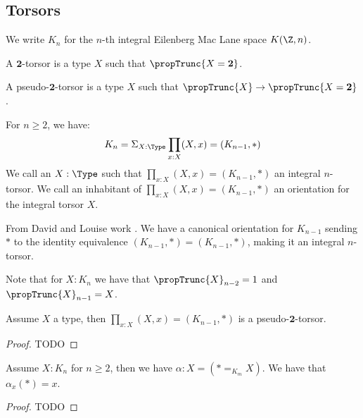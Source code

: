 
\subsection{Torsors}

We write $K_n$ for the $n$-th integral Eilenberg Mac Lane space $K(\Z,n)$.

\begin{definition}
A $\mathbf{2}$-torsor is a type $X$ such that $\propTrunc{X=\mathbf{2}}$.
\end{definition}

\begin{definition}
A pseudo-$\mathbf{2}$-torsor is a type $X$ such that $\propTrunc{X}\to \propTrunc{X=\mathbf{2}}$.
\end{definition}

\begin{lemma}
For $n\geq 2$, we have:
\[K_{n} = \Sigma_{X:\Type} \prod_{x:X}(X,x) = (K_{n-1},*)\]
We call an $X:\Type$ such that $\prod_{x:X}(X,x) = (K_{n-1},*)$ an integral $n$-torsor. We call an inhabitant of $\prod_{x:X}(X,x) = (K_{n-1},*)$ an orientation for the integral torsor $X$.
\end{lemma}

From David and Louise work \cite{}. We have a canonical orientation for $K_{n-1}$ sending $*$ to the identity equivalence $(K_{n-1},*) = (K_{n-1},*)$, making it an integral $n$-torsor.

Note that for $X:K_n$ we have that $\propTrunc{X}_{n-2} = 1$ and $\propTrunc{X}_{n-1} = X$.

\begin{lemma}
Assume $X$ a type, then $\prod_{x:X}(X,x) = (K_{n-1},*)$ is a pseudo-$\mathbf{2}$-torsor.
\end{lemma}

\begin{proof}
TODO
\end{proof}

\begin{lemma}
Assume $X:K_n$ for $n\geq 2$, then we have $\alpha : X = (* =_{K_m} X)$. We have that $\alpha_x(*) = x$.
\end{lemma}

\begin{proof}
TODO
\end{proof}

